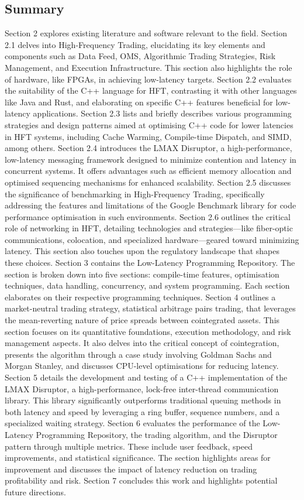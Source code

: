 \documentclass{article}
\theoremstyle{break}
\begin{document}
\subsection{Summary}
Section 2 explores existing literature and software relevant to the field. Section 2.1 delves into High-Frequency Trading, elucidating its key elements and components such as Data Feed, OMS, Algorithmic Trading Strategies, Risk Management, and Execution Infrastructure. This section also highlights the role of hardware, like FPGAs, in achieving low-latency targets. Section 2.2 evaluates the suitability of the C++ language for HFT, contrasting it with other languages like Java and Rust, and elaborating on specific C++ features beneficial for low-latency applications. Section 2.3 lists and briefly describes various programming strategies and design patterns aimed at optimising C++ code for lower latencies in HFT systems, including Cache Warming, Compile-time Dispatch, and SIMD, among others. Section 2.4 introduces the LMAX Disruptor, a high-performance, low-latency messaging framework designed to minimize contention and latency in concurrent systems. It offers advantages such as efficient memory allocation and optimised sequencing mechanisms for enhanced scalability. Section 2.5 discusses the significance of benchmarking in High-Frequency Trading, specifically addressing the features and limitations of the Google Benchmark library for code performance optimisation in such environments. Section 2.6 outlines the critical role of networking in HFT, detailing technologies and strategies—like fiber-optic communications, colocation, and specialized hardware—geared toward minimizing latency. This section also touches upon the regulatory landscape that shapes these choices. Section 3 contains the Low-Latency Programming Repository. The section is broken down into five sections: compile-time features, optimisation techniques, data handling, concurrency, and system programming. Each section elaborates on their respective programming techniques. Section 4 outlines a market-neutral trading strategy, statistical arbitrage pairs trading, that leverages the mean-reverting nature of price spreads between cointegrated assets. This section focuses on its quantitative foundations, execution methodology, and risk management aspects. It also delves into the critical concept of cointegration, presents the algorithm through a case study involving Goldman Sachs and Morgan Stanley, and discusses CPU-level optimisations for reducing latency. Section 5 details the development and testing of a C++ implementation of the LMAX Disruptor, a high-performance, lock-free inter-thread communication library. This library significantly outperforms traditional queuing methods in both latency and speed by leveraging a ring buffer, sequence numbers, and a specialized waiting strategy. Section 6 evaluates the performance of the Low-Latency Programming Repository, the trading algorithm, and the Disruptor pattern through multiple metrics. These include user feedback, speed improvements, and statistical significance. The section highlights areas for improvement and discusses the impact of latency reduction on trading profitability and risk. Section 7 concludes this work and highlights potential future directions.
\end{document}

